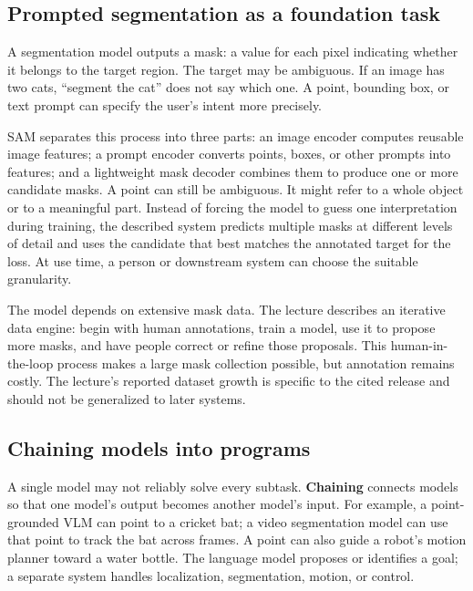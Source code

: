\subsection{Prompted segmentation as a foundation task}\label{04-visual-computing-ii-ch031-prompted-segmentation-as-a-foundation-task}

\hypertarget{04-visual-computing-ii-ch031-prompted-segmentation-as-a-foundation-task}{}

A segmentation model outputs a mask: a value for each pixel indicating whether it belongs to the target region. The target may be ambiguous. If an image has two cats, ``segment the cat'' does not say which one. A point, bounding box, or text prompt can specify the user's intent more precisely.

SAM separates this process into three parts: an image encoder computes reusable image features; a prompt encoder converts points, boxes, or other prompts into features; and a lightweight mask decoder combines them to produce one or more candidate masks. A point can still be ambiguous. It might refer to a whole object or to a meaningful part. Instead of forcing the model to guess one interpretation during training, the described system predicts multiple masks at different levels of detail and uses the candidate that best matches the annotated target for the loss. At use time, a person or downstream system can choose the suitable granularity.

The model depends on extensive mask data. The lecture describes an iterative data engine: begin with human annotations, train a model, use it to propose more masks, and have people correct or refine those proposals. This human-in-the-loop process makes a large mask collection possible, but annotation remains costly. The lecture's reported dataset growth is specific to the cited release and should not be generalized to later systems.

\subsection{Chaining models into programs}\label{04-visual-computing-ii-ch031-chaining-models-into-programs}

\hypertarget{04-visual-computing-ii-ch031-chaining-models-into-programs}{}

A single model may not reliably solve every subtask. \textbf{Chaining} connects models so that one model's output becomes another model's input. For example, a point-grounded VLM can point to a cricket bat; a video segmentation model can use that point to track the bat across frames. A point can also guide a robot's motion planner toward a water bottle. The language model proposes or identifies a goal; a separate system handles localization, segmentation, motion, or control.

